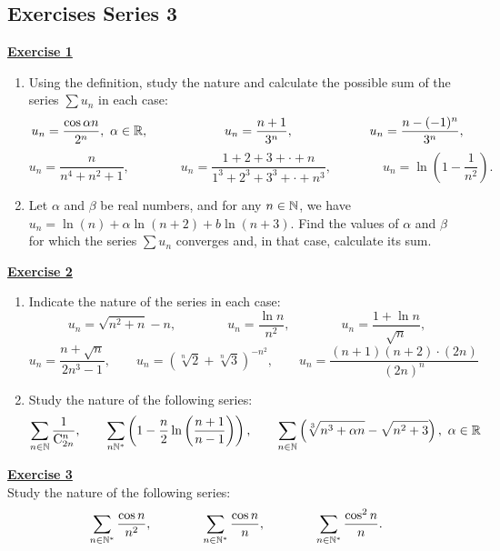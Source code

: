 \subsection{Exercises Series 3}
\vspace*{0.2cm}
\Large{\underline{\textbf{Exercise 1}}}
\normalsize{}
\begin{enumerate}
    \item Using the definition, study the nature and calculate the possible sum 
    of the series $\displaystyle\sum u_n $ in each case:
        $$ u_n = \dfrac{\cos \alpha n}{2^n},\ \alpha\in\mathbb{R},\qquad \qquad \qquad 
           u_n = \dfrac{n + 1}{3^n}, \qquad \qquad \qquad u_n = \dfrac{n - (-1)^n}{3^n}, $$
        $$ u_n = \dfrac{n}{n^4 + n^2 + 1},\qquad \qquad 
           u_n = \dfrac{1 + 2 + 3 + \cdot + n}{1^3 + 2^3 + 3^3 + \cdot + n^3},\qquad \qquad 
           u_n = \ln(1 - \dfrac{1}{n^2}). $$
    \item Let $\alpha$ and $\beta$ be real numbers, and for any $n\in\mathbb{N}$, we have 
    $u_n = \ln(n) + \alpha\ln(n + 2) + b\ln(n + 3).$ Find the values of $\alpha$ and $\beta$ for which the series
    $\displaystyle\sum u_n$ converges and, in that case, calculate its sum.\\
\end{enumerate}

\Large{\underline{\textbf{Exercise 2}}}
\normalsize{}
\begin{enumerate}
    \item Indicate the nature of the series in each case:
        $$ u_n = \sqrt{n^2 + n} - n, \qquad\qquad u_n = \dfrac{\ln n}{n^2},\qquad \qquad
           u_n = \dfrac{1 + \ln n}{\sqrt{n}},$$
        $$ u_n = \dfrac{n + \sqrt{n}}{2n^3 - 1}, \qquad
           u_n = \left(\sqrt[n]{2} + \sqrt[n]{3}\right)^{-n^2}, \qquad
           u_n = \dfrac{(n + 1)(n + 2)\cdot(2n)}{(2n)^n}$$
    \item Study the nature of the following series:
        $$ \sum_{n\in\mathbb{N}}\dfrac{1}{\mathrm{C}^n_{2n}},\qquad 
           \sum_{n\mathbb{N}^*}\left(1 - \dfrac{n}{2}\ln\left(\dfrac{n + 1}{n - 1}\right)\right),\qquad
           \sum_{n\in\mathbb{N}}\left(\sqrt[3]{n^3 + \alpha n} - \sqrt{n^2 + 3}\right),\ \alpha\in\mathbb{R} $$
\end{enumerate}

\noindent\Large{\underline{\textbf{Exercise 3}}}
\normalsize{}\\
\noindent Study the nature of the following series:
$$ \sum_{n\in\mathbb{N}^*}\dfrac{\cos n}{n^2}, \qquad \qquad \sum_{n\in\mathbb{N}^*}\frac{\cos n}{n},\qquad \qquad 
   \sum_{n\in\mathbb{N}^*}\dfrac{\cos^2n}{n}. $$

